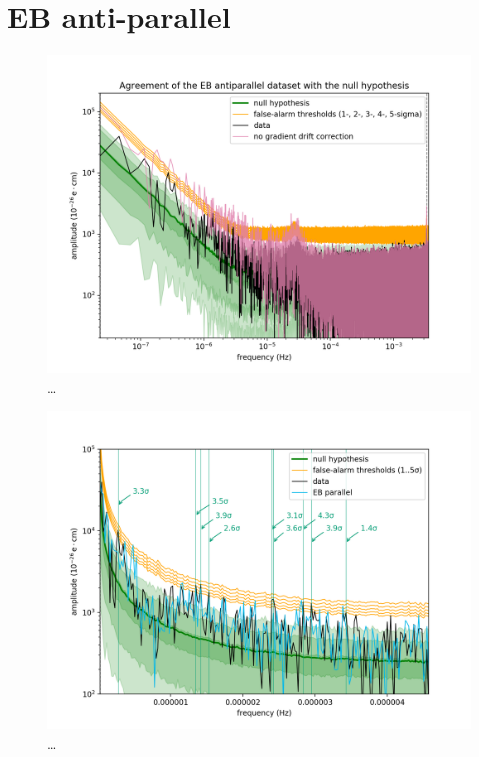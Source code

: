 \section{EB anti-parallel}
\begin{figure}
  \centering
  \includegraphics[width=\linewidth]{gfx/axions/AP_detection_and_no_GDC.png}
  \caption{\ldots}
  \label{fig:axions_AP_detection_and_no_GDC}
\end{figure}
\begin{figure}
  \centering
  \includegraphics[width=\linewidth]{gfx/axions/AP_detection_area1.png}
  \caption{\ldots}
  \label{fig:axions_AP_detection_area1}
\end{figure}
